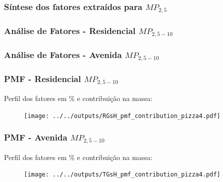 \begin{frame}
  \frametitle{Síntese dos fatores extraídos para $MP_{2,5}$}
  \begin{table}[H]
    \centering
    \tiny
    
  \end{table}
  
    \begin{table}[H]
    	\centering
    	\tiny
    	
    \end{table}
\end{frame}

\begin{frame}
  \frametitle{Análise de Fatores - Residencial $MP_{2,5-10}$}        
  \begin{table}[H]
    \centering
    \tiny
    
  \end{table}
\end{frame}

\begin{frame}
  \frametitle{Análise de Fatores - Avenida $MP_{2,5-10}$}    
  \begin{table}[H]
    \centering
    \tiny
    
  \end{table}
\end{frame}

\begin{frame}
  \frametitle{PMF - Residencial $MP_{2,5-10}$}
  Perfil dos fatores em \% e contribuição na massa:
    \begin{figure}
      \centering
            \begin{minipage}[b]{0.4\linewidth}
              \tiny
              
            \end{minipage}
                  \hspace{3cm}
      \begin{minipage}[b]{0.3\linewidth}
        \texttt{[image: ../../outputs/RGsH\_pmf\_contribution\_pizza4.pdf]}
      \end{minipage}%
    \end{figure}
\end{frame}

\begin{frame}
  \frametitle{PMF - Avenida $MP_{2,5-10}$}
  Perfil dos fatores em \% e contribuição na massa:
    \begin{figure}
      \centering
            \begin{minipage}[b]{0.4\linewidth}
              \tiny
              
            \end{minipage}
                  \hspace{3cm}
      \begin{minipage}[b]{0.3\linewidth}
        \texttt{[image: ../../outputs/TGsH\_pmf\_contribution\_pizza4.pdf]}
      \end{minipage}%
    \end{figure}
\end{frame}

